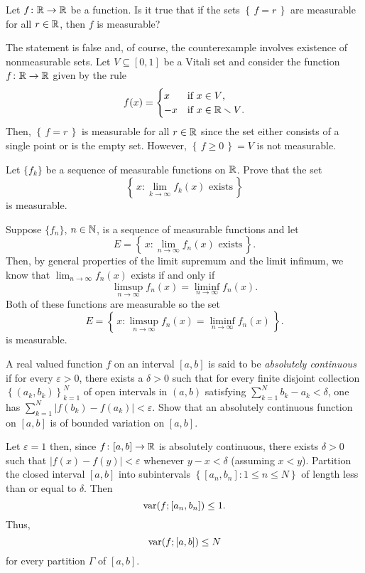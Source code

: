 \begin{problem}
  Let \(f\colon\mathbb{R}\to\mathbb{R}\) be a function. Is it true that if the sets
  \(\left\{\,f=r\,\right\}\) are measurable for all \(r\in\mathbb{R}\), then
  \(f\) is measurable?
\end{problem}
\begin{solution}
  The statement is false and, of course, the counterexample involves
  existence of nonmeasurable sets. Let \(V\subseteq[0,1]\) be a Vitali set
  and consider the function \(f\colon\mathbb{R}\to\mathbb{R}\) given by the rule
  \[
    f(x)=
    \begin{cases}
      x&\text{if \(x\in V\),}\\
      -x&\text{if \(x\in\mathbb{R}\smallsetminus V\).}
    \end{cases}
  \]
  Then, \(\left\{\,f=r\,\right\}\) is measurable for all \(r\in\mathbb{R}\) since
  the set either consists of a single point or is the empty set. However,
  \(\left\{\,f\geq 0\,\right\}=V\) is not measurable.
\end{solution}

\begin{problem}
  Let \(\{f_k\}\) be a sequence of measurable functions on \(\mathbb{R}\). Prove
  that the set
  \[
    \left\{\,x:\text{\(\lim_{k\to\infty} f_k(x)\) exists}\,\right\}
  \]
  is measurable.
\end{problem}
\begin{solution}
  Suppose \({\{f_n\}}\), \(n\in\mathbb{N}\), is a sequence of measurable
  functions and let
  \[
    E=\left\{\,x: \text{\(\lim_{n\to\infty} f_n(x)\) exists} \,\right\}.
  \]
  Then, by general properties of the limit supremum and the limit infimum,
  we know that \(\lim_{n\to\infty}f_n(x)\) exists if and only if
  \[
    \limsup_{n\to\infty}f_n(x)=\liminf_{n\to\infty}f_n(x).
  \]
  Both of these functions are measurable so the set
  \[
    E=\left\{\,x:\limsup_{n\to\infty}f_n(x)=\liminf_{n\to\infty}f_n(x)\,\right\}.
  \]
  is measurable.
\end{solution}

\begin{problem}
  A real valued function \(f\) on an interval \([a,b]\) is said to be
  \emph{absolutely continuous} if for every \(\varepsilon>0\), there exists
  a \(\delta>0\) such that for every finite disjoint collection
  \(\left\{(a_k,b_k)\right\}_{k=1}^N\) of open intervals in \((a,b)\)
  satisfying \(\sum_{k=1}^Nb_k-a_k<\delta\), one has
  \(\sum_{k=1}^N\left|f(b_k)-f(a_k)\right|<\varepsilon\). Show that an
  absolutely continuous function on \([a,b]\) is of bounded variation on
  \([a,b]\).
\end{problem}
\begin{solution}
  Let \(\varepsilon=1\) then, since \(f\colon[a,b]\to\mathbb{R}\) is absolutely
  continuous, there exists \(\delta>0\) such that
  \(|f(x)-f(y)|<\varepsilon\) whenever \(y-x<\delta\) (assuming
  \(x<y\)). Partition the closed interval \([a,b]\) into subintervals
  \(\left\{[a_n,b_n]:1\leq n\leq N\right\}\) of length less than or equal
  to \(\delta\). Then
  \[
    \operatorname{var}(f;[a_n,b_n])\leq 1.
  \]
  Thus,
  \[
    \operatorname{var}(f;[a,b])\leq N
  \]
  for every partition \(\Gamma\) of \([a,b]\).
\end{solution}

